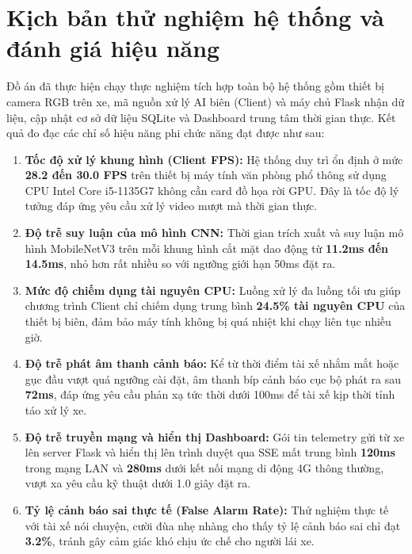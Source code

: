 \documentclass[../DoAn.tex]{subfiles}
\begin{document}
\section{Kịch bản thử nghiệm hệ thống và đánh giá hiệu năng}
\label{section:5.4}
Đồ án đã thực hiện chạy thực nghiệm tích hợp toàn bộ hệ thống gồm thiết bị camera RGB trên xe, mã nguồn xử lý AI biên (Client) và máy chủ Flask nhận dữ liệu, cập nhật cơ sở dữ liệu SQLite và Dashboard trung tâm thời gian thực.
Kết quả đo đạc các chỉ số hiệu năng phi chức năng đạt được như sau:
\begin{enumerate}
    \item \textbf{Tốc độ xử lý khung hình (Client FPS):} Hệ thống duy trì ổn định ở mức \textbf{28.2 đến 30.0 FPS} trên thiết bị máy tính văn phòng phổ thông sử dụng CPU Intel Core i5-1135G7 không cần card đồ họa rời GPU. Đây là tốc độ lý tưởng đáp ứng yêu cầu xử lý video mượt mà thời gian thực.
    \item \textbf{Độ trễ suy luận của mô hình CNN:} Thời gian trích xuất và suy luận mô hình MobileNetV3 trên mỗi khung hình cắt mặt dao động từ \textbf{11.2ms đến 14.5ms}, nhỏ hơn rất nhiều so với ngưỡng giới hạn 50ms đặt ra.
    \item \textbf{Mức độ chiếm dụng tài nguyên CPU:} Luồng xử lý đa luồng tối ưu giúp chương trình Client chỉ chiếm dụng trung bình \textbf{24.5\% tài nguyên CPU} của thiết bị biên, đảm bảo máy tính không bị quá nhiệt khi chạy liên tục nhiều giờ.
    \item \textbf{Độ trễ phát âm thanh cảnh báo:} Kể từ thời điểm tài xế nhắm mắt hoặc gục đầu vượt quá ngưỡng cài đặt, âm thanh bíp cảnh báo cục bộ phát ra sau \textbf{72ms}, đáp ứng yêu cầu phản xạ tức thời dưới 100ms để tài xế kịp thời tỉnh táo xử lý xe.
    \item \textbf{Độ trễ truyền mạng và hiển thị Dashboard:} Gói tin telemetry gửi từ xe lên server Flask và hiển thị lên trình duyệt qua SSE mất trung bình \textbf{120ms} trong mạng LAN và \textbf{280ms} dưới kết nối mạng di động 4G thông thường, vượt xa yêu cầu kỹ thuật dưới 1.0 giây đặt ra.
    \item \textbf{Tỷ lệ cảnh báo sai thực tế (False Alarm Rate):} Thử nghiệm thực tế với tài xế nói chuyện, cười đùa nhẹ nhàng cho thấy tỷ lệ cảnh báo sai chỉ đạt \textbf{3.2\%}, tránh gây cảm giác khó chịu ức chế cho người lái xe.
\end{enumerate}
\end{document}
